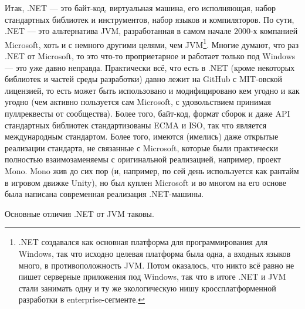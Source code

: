 \documentclass[a5paper]{article}
\begin{document}
Итак, .NET --- это байт-код, виртуальная машина, его исполняющая, набор стандартных библиотек и инструментов, набор языков и компиляторов. По сути, .NET --- это альтернатива JVM, разработанная в самом начале 2000-х компанией Microsoft, хоть и с немного другими целями, чем JVM\footnote{.NET создавался как основная платформа для программирования для Windows, так что исходно целевая платформа была одна, а входных языков много, в противоположность JVM. Потом оказалось, что никто всё равно не пишет серверные приложения под Windows, так что в итоге .NET и JVM стали занимать одну и ту же экологическую нишу кроссплатформенной разработки в enterprise-сегменте.}. Многие думают, что раз .NET от Microsoft, то это что-то проприетарное и работает только под Windows --- это уже давно неправда. Практически всё, что есть в .NET (кроме некоторых библиотек и частей среды разработки) давно лежит на GitHub с MIT-овской лицензией, то есть может быть использовано и модифицировано кем угодно и как угодно (чем активно пользуется сам Microsoft, с удовольствием принимая пуллреквесты от сообщества). Более того, байт-код, формат сборок и даже API стандартных библиотек стандартизованы ECMA и ISO, так что является международным стандартом. Более того, имеются (имелись) даже открытые реализации стандарта, не связанные с Microsoft, которые были практически полностью взаимозаменяемы с оригинальной реализацией, например, проект Mono. Mono жив до сих пор (и, например, по сей день используется как рантайм в игровом движке Unity), но был куплен Microsoft и во многом на его основе была написана современная реализация .NET-машины.

Основные отличия .NET от JVM таковы.
\end{document}
